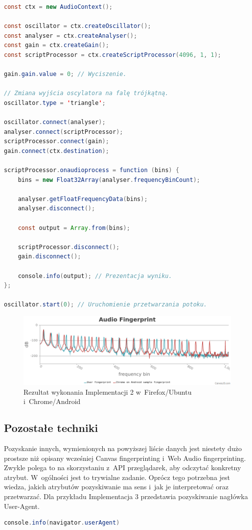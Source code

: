 \begin{lstlisting}[float,language=Java,caption=Podstawowy Web Audio fingerprinting w~JavaScript]
const ctx = new AudioContext();

const oscillator = ctx.createOscillator();
const analyser = ctx.createAnalyser();
const gain = ctx.createGain();
const scriptProcessor = ctx.createScriptProcessor(4096, 1, 1);

gain.gain.value = 0; // Wyciszenie.

// Zmiana wyjścia oscylatora na falę trójkątną.
oscillator.type = 'triangle';

oscillator.connect(analyser);
analyser.connect(scriptProcessor);
scriptProcessor.connect(gain);
gain.connect(ctx.destination);

scriptProcessor.onaudioprocess = function (bins) {
    bins = new Float32Array(analyser.frequencyBinCount);

    analyser.getFloatFrequencyData(bins);
    analyser.disconnect();

    const output = Array.from(bins);

    scriptProcessor.disconnect();
    gain.disconnect();

    console.info(output); // Prezentacja wyniku.
};

oscillator.start(0); // Uruchomienie przetwarzania potoku.
\end{lstlisting}

\begin{figure}
	\includegraphics[width=\textwidth,keepaspectratio]{img/08}
	\caption{Rezultat wykonania Implementacji 2 w~Firefox/Ubuntu i~Chrome/Android}
\end{figure}

\subsection{Pozostałe techniki}
Pozyskanie innych, wymienionych na powyższej liście danych jest niestety dużo
prostsze niż opisany wcześniej Canvas fingerprinting i~Web Audio fingerprinting.
Zwykle polega to na skorzystaniu z~API przeglądarek, aby odczytać konkretny
atrybut. W~ogólności jest to trywialne zadanie. Oprócz tego potrzebna jest
wiedza, jakich atrybutów pozyskiwanie ma sens i~jak je interpretować oraz
przetwarzać. Dla przykładu Implementacja 3 przedstawia pozyskiwanie nagłówka
User-Agent.

\begin{lstlisting}[float,language=Java,caption=Wypisywanie nagłówka User-Agent do konsoli JavaScript]
console.info(navigator.userAgent)
\end{lstlisting}
